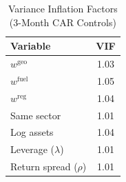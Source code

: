 \begin{table}[!htbp]
\centering
\caption{Variance Inflation Factors (3-Month CAR Controls)}
\label{tab:vif_controls}
\begin{tabular}{lc}
\toprule
Variable & VIF \\
\midrule
$w^{\mathrm{geo}}$ & 1.03 \\
$w^{\mathrm{fuel}}$ & 1.05 \\
$w^{\mathrm{reg}}$ & 1.04 \\
Same sector & 1.01 \\
Log assets & 1.04 \\
Leverage ($\lambda$) & 1.01 \\
Return spread ($\rho$) & 1.01 \\
\bottomrule
\end{tabular}
\end{table}